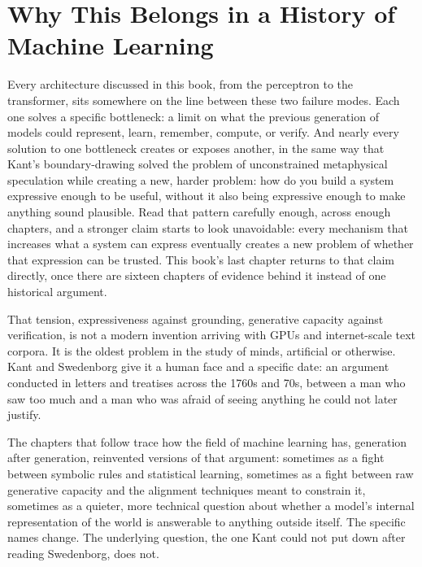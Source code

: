 \section*{Why This Belongs in a History of Machine Learning}

Every architecture discussed in this book, from the perceptron to the transformer, sits somewhere on the line between these two failure modes. Each one solves a specific bottleneck: a limit on what the previous generation of models could represent, learn, remember, compute, or verify. And nearly every solution to one bottleneck creates or exposes another, in the same way that Kant's boundary-drawing solved the problem of unconstrained metaphysical speculation while creating a new, harder problem: how do you build a system expressive enough to be useful, without it also being expressive enough to make anything sound plausible. Read that pattern carefully enough, across enough chapters, and a stronger claim starts to look unavoidable: every mechanism that increases what a system can express eventually creates a new problem of whether that expression can be trusted. This book's last chapter returns to that claim directly, once there are sixteen chapters of evidence behind it instead of one historical argument.

That tension, expressiveness against grounding, generative capacity against verification, is not a modern invention arriving with GPUs and internet-scale text corpora. It is the oldest problem in the study of minds, artificial or otherwise. Kant and Swedenborg give it a human face and a specific date: an argument conducted in letters and treatises across the 1760s and 70s, between a man who saw too much and a man who was afraid of seeing anything he could not later justify.

The chapters that follow trace how the field of machine learning has, generation after generation, reinvented versions of that argument: sometimes as a fight between symbolic rules and statistical learning, sometimes as a fight between raw generative capacity and the alignment techniques meant to constrain it, sometimes as a quieter, more technical question about whether a model's internal representation of the world is answerable to anything outside itself. The specific names change. The underlying question, the one Kant could not put down after reading Swedenborg, does not.
